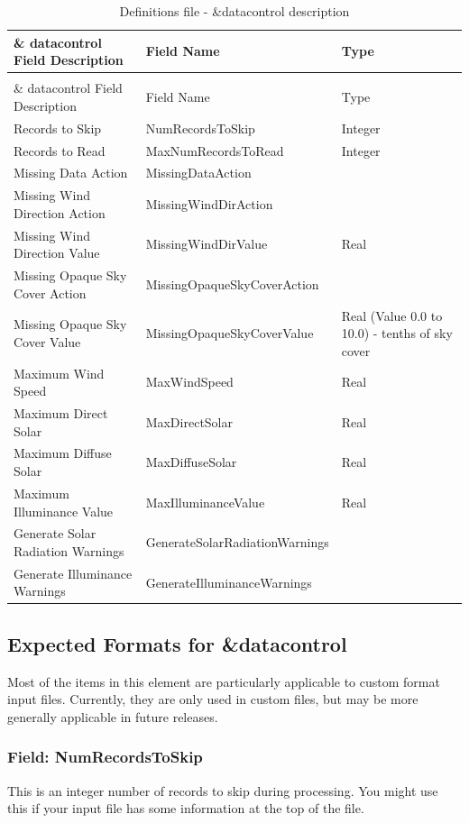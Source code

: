 \begin{longtable}[c]{p{1.81in}p{1.65in}p{2.52in}}
\caption{Definitions file - \&datacontrol description \label{table:definitions-file-datacontrol-description}} \tabularnewline
\toprule 
\& datacontrol Field Description & Field Name & Type \tabularnewline \midrule
\endfirsthead

\caption[]{Definitions file - \&datacontrol description} \tabularnewline
\toprule 
\& datacontrol Field Description & Field Name & Type \tabularnewline \midrule
\endhead

Records to Skip & NumRecordsToSkip & Integer \tabularnewline
Records to Read & MaxNumRecordsToRead & Integer \tabularnewline
Missing Data Action & MissingDataAction &  \tabularnewline
Missing Wind Direction Action & MissingWindDirAction &  \tabularnewline
Missing Wind Direction Value & MissingWindDirValue & Real \tabularnewline
Missing Opaque Sky Cover Action & MissingOpaqueSkyCoverAction &  \tabularnewline
Missing Opaque Sky Cover Value & MissingOpaqueSkyCoverValue & Real (Value 0.0 to 10.0) - tenths of sky cover \tabularnewline
Maximum Wind Speed & MaxWindSpeed & Real \tabularnewline
Maximum Direct Solar & MaxDirectSolar & Real \tabularnewline
Maximum Diffuse Solar & MaxDiffuseSolar & Real \tabularnewline
Maximum Illuminance Value & MaxIlluminanceValue & Real \tabularnewline
Generate Solar Radiation Warnings & GenerateSolarRadiationWarnings &  \tabularnewline
Generate Illuminance Warnings & GenerateIlluminanceWarnings &  \tabularnewline
\bottomrule
\end{longtable}

\subsection{Expected Formats for \&datacontrol}\label{expected-formats-for-datacontrol}

Most of the items in this element are particularly applicable to custom format input files. Currently, they are only used in custom files, but may be more generally applicable in future releases.

\subsubsection{Field: NumRecordsToSkip}\label{field-numrecordstoskip}

This is an integer number of records to skip during processing. You might use this if your input file has some information at the top of the file.

